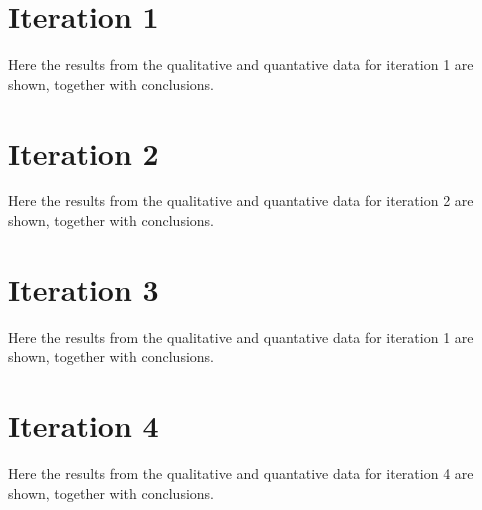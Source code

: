 \section{Iteration 1}

Here the results from the qualitative and quantative data for iteration 1 are shown, together with conclusions.





\section{Iteration 2}

Here the results from the qualitative and quantative data for iteration 2 are shown, together with conclusions.





\section{Iteration 3}

Here the results from the qualitative and quantative data for iteration 1 are shown, together with conclusions.





\section{Iteration 4}

Here the results from the qualitative and quantative data for iteration 4 are shown, together with conclusions.





%
%
%  
%  
%  
%  
%
%
%
%  
%  
%  
%  
%
%
%  
%  
%  
%  


%


